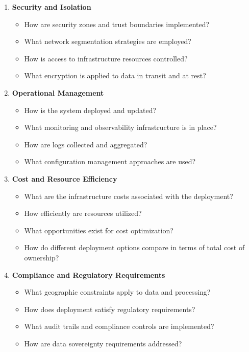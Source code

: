 \documentclass[11pt,letterpaper]{article}
\begin{document}
\begin{enumerate}[label=\textbf{C\arabic*:}, leftmargin=2.5em]
    \item \textbf{Security and Isolation}
    \begin{itemize}[nosep]
        \item How are security zones and trust boundaries implemented?
        \item What network segmentation strategies are employed?
        \item How is access to infrastructure resources controlled?
        \item What encryption is applied to data in transit and at rest?
    \end{itemize}
    
    \item \textbf{Operational Management}
    \begin{itemize}[nosep]
        \item How is the system deployed and updated?
        \item What monitoring and observability infrastructure is in place?
        \item How are logs collected and aggregated?
        \item What configuration management approaches are used?
    \end{itemize}
    
    \item \textbf{Cost and Resource Efficiency}
    \begin{itemize}[nosep]
        \item What are the infrastructure costs associated with the deployment?
        \item How efficiently are resources utilized?
        \item What opportunities exist for cost optimization?
        \item How do different deployment options compare in terms of total cost of ownership?
    \end{itemize}
    
    \item \textbf{Compliance and Regulatory Requirements}
    \begin{itemize}[nosep]
        \item What geographic constraints apply to data and processing?
        \item How does deployment satisfy regulatory requirements?
        \item What audit trails and compliance controls are implemented?
        \item How are data sovereignty requirements addressed?
    \end{itemize}
\end{enumerate}
\end{document}
